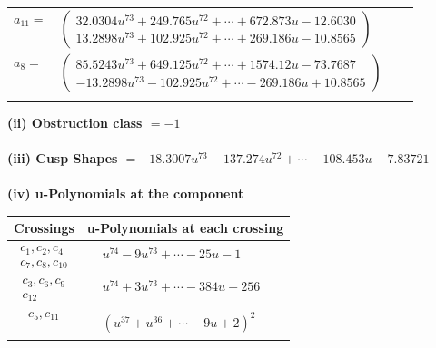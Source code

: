 \documentclass[1p]{elsarticle_modified}
\theoremstyle{definition}
\begin{document}
\begin{tabular}{m{7pt} m{180pt} m{7pt} m{180pt} }
\flushright $a_{11}=$&$\begin{pmatrix}32.0304 u^{73}+249.765 u^{72}+\cdots+672.873 u-12.6030\\13.2898 u^{73}+102.925 u^{72}+\cdots+269.186 u-10.8565\end{pmatrix}$ \\
\flushright $a_{8}=$&$\begin{pmatrix}85.5243 u^{73}+649.125 u^{72}+\cdots+1574.12 u-73.7687\\-13.2898 u^{73}-102.925 u^{72}+\cdots-269.186 u+10.8565\end{pmatrix}$\\&\end{tabular}
\flushleft \textbf{(ii) Obstruction class $= -1$}\\~\\
\flushleft \textbf{(iii) Cusp Shapes $= -18.3007 u^{73}-137.274 u^{72}+\cdots-108.453 u-7.83721$}\\~\\
\newpage\renewcommand{\arraystretch}{1}
\flushleft \textbf{(iv) u-Polynomials at the component}\newline \\
\begin{tabular}{m{50pt}|m{274pt}}
Crossings & \hspace{64pt}u-Polynomials at each crossing \\
\hline $$\begin{aligned}c_{1},c_{2},c_{4}\\c_{7},c_{8},c_{10}\end{aligned}$$&$\begin{aligned}
&u^{74}-9 u^{73}+\cdots-25 u-1
\end{aligned}$\\
\hline $$\begin{aligned}c_{3},c_{6},c_{9}\\c_{12}\end{aligned}$$&$\begin{aligned}
&u^{74}+3 u^{73}+\cdots-384 u-256
\end{aligned}$\\
\hline $$\begin{aligned}c_{5},c_{11}\end{aligned}$$&$\begin{aligned}
&(u^{37}+u^{36}+\cdots-9 u+2)^{2}
\end{aligned}$\\
\hline
\end{tabular}\\~\\
\end{document}
